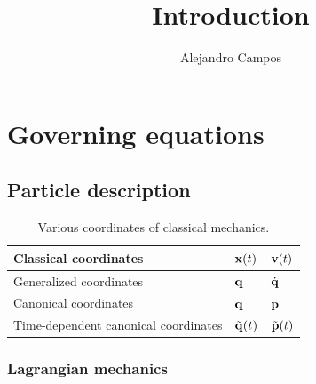 \documentclass[a4paper,11pt]{report}
\title{Introduction}
\author{Alejandro Campos}
\newcommand{\qvecdot}{\dot{\qvec}}
\begin{document}
\maketitle
\tableofcontents

\chapter{Governing equations}

\section{Particle description}
\begin{table}[H]
    \renewcommand{\arraystretch}{1.5}
    \centering
    \caption{Various coordinates of classical mechanics. }
    \label{tb:classical_mechanics_coordinates}
     \begin{tabular}{|l|l|l|}
        \hline
        Classical coordinates & $\mathbf{x}(t)$ & $\mathbf{v}(t)$ \\
        \hline
        Generalized coordinates  & $\mathbf{q}$ & $\qvecdot$ \\
        \hline
        Canonical coordinates & $\mathbf{q}$ & $\mathbf{p}$ \\
        \hline
        Time-dependent canonical coordinates & $\tilde{\mathbf{q}}(t)$ & $ \tilde{\mathbf{p}}(t)$ \\
        \hline
     \end{tabular}
\end{table}
    
\subsection{Lagrangian mechanics}
    
\end{document}
